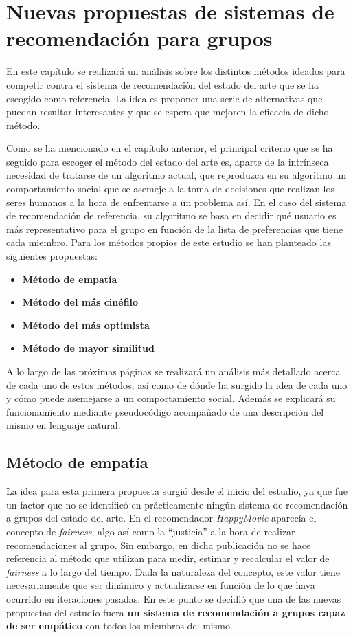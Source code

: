 \chapter{Nuevas propuestas de sistemas de recomendación para grupos}

En este capítulo se realizará un análisis sobre los distintos métodos ideados para competir contra el sistema de recomendación del estado del arte que se ha escogido como referencia. La idea es proponer una serie de alternativas que puedan resultar interesantes y que se espera que mejoren la eficacia de dicho método.

Como se ha mencionado en el capítulo anterior, el principal criterio que se ha seguido para escoger el método del estado del arte es, aparte de la intrínseca necesidad de tratarse de un algoritmo actual, que reproduzca en su algoritmo un comportamiento social que se asemeje a la toma de decisiones que realizan los seres humanos a la hora de enfrentarse a un problema así. En el caso del sistema de recomendación de referencia, su algoritmo se basa en decidir qué usuario es más representativo para el grupo en función de la lista de preferencias que tiene cada miembro. Para los métodos propios de este estudio se han planteado las siguientes propuestas:

\begin{itemize}
	\item \textbf{Método de empatía}
	\item \textbf{Método del más cinéfilo}
	\item \textbf{Método del más optimista}
	\item \textbf{Método de mayor similitud}
\end{itemize}

A lo largo de las próximas páginas se realizará un análisis más detallado acerca de cada uno de estos métodos, así como de dónde ha surgido la idea de cada uno y cómo puede asemejarse a un comportamiento social. Además se explicará su funcionamiento mediante pseudocódigo acompañado de una descripción del mismo en lenguaje natural.

\section{Método de empatía}

La idea para esta primera propuesta surgió desde el inicio del estudio, ya que fue un factor que no se identificó en prácticamente ningún sistema de recomendación a grupos del estado del arte. En el recomendador \textit{HappyMovie} \cite{happymovie2011} aparecía el concepto de \textit{fairness}, algo así como la ``justicia'' a la hora de realizar recomendaciones al grupo. Sin embargo, en dicha publicación no se hace referencia al método que utilizan para medir, estimar y recalcular el valor de \textit{fairness} a lo largo del tiempo. Dada la naturaleza del concepto, este valor tiene necesariamente que ser dinámico y actualizarse en función de lo que haya ocurrido en iteraciones pasadas. En este punto se decidió que una de las nuevas propuestas del estudio fuera \textbf{un sistema de recomendación a grupos capaz de ser empático} con todos los miembros del mismo.

